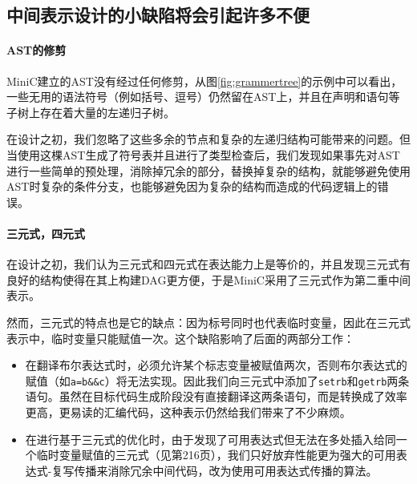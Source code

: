 \subsection*{中间表示设计的小缺陷将会引起许多不便}
\paragraph*{AST的修剪}
MiniC建立的AST没有经过任何修剪，从图\ref{fig:grammertree}的示例中可以看出，一些无用的语法符号（例如括号、逗号）仍然留在AST上，并且在声明和语句等子树上存在着大量的左递归子树。

在设计之初，我们忽略了这些多余的节点和复杂的左递归结构可能带来的问题。但当使用这棵AST生成了符号表并且进行了类型检查后，我们发现如果事先对AST进行一些简单的预处理，消除掉冗余的部分，替换掉复杂的结构，就能够避免使用AST时复杂的条件分支，也能够避免因为复杂的结构而造成的代码逻辑上的错误。

\paragraph*{三元式，四元式}
在设计之初，我们认为三元式和四元式在表达能力上是等价的，并且发现三元式有良好的结构使得在其上构建DAG更方便，于是MiniC采用了三元式作为第二重中间表示。

然而，三元式的特点也是它的缺点：因为标号同时也代表临时变量，因此在三元式表示中，临时变量只能赋值一次。这个缺陷影响了后面的两部分工作：
\begin{itemize}
\item 在翻译布尔表达式时，必须允许某个标志变量被赋值两次，否则布尔表达式的赋值（如\verb|a=b&&c|）将无法实现。因此我们向三元式中添加了\verb|setrb|和\verb|getrb|两条语句。虽然在目标代码生成阶段没有直接翻译这两条语句，而是转换成了效率更高，更易读的汇编代码，这种表示仍然给我们带来了不少麻烦。
\item 在进行基于三元式的优化时，由于发现了可用表达式但无法在多处插入给同一个临时变量赋值的三元式（见\cite{sunjiasu}第216页），我们只好放弃性能更为强大的可用表达式-复写传播来消除冗余中间代码，改为使用可用表达式传播的算法。
\end{itemize}
